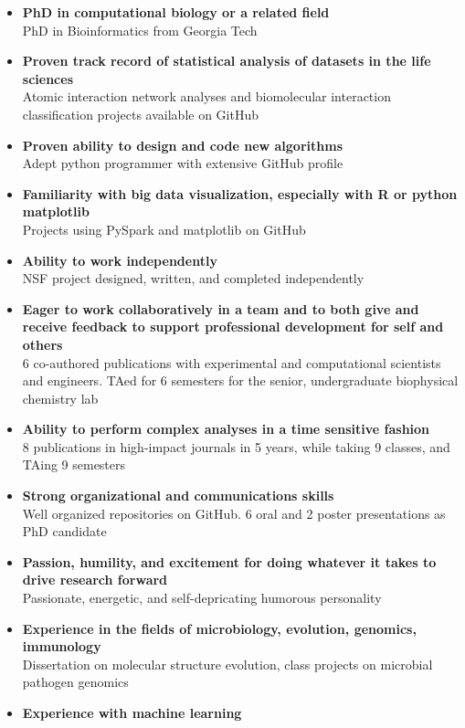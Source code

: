 \documentclass[11pt, letterpaper]{CV_latex_class}
\begin{document}
\begin{cvletter}
\begin{itemize}
	\setlength{\itemsep}{-0.75em}
	\item {\bf PhD in computational biology or a related field}
	\\ PhD in Bioinformatics from Georgia Tech
	\item {\bf Proven track record of statistical analysis of datasets in the life sciences}
	\\ Atomic interaction network analyses and biomolecular interaction classification projects available on GitHub
	\item {\bf Proven ability to design and code new algorithms}
	\\ Adept python programmer with extensive GitHub profile
	\item {\bf Familiarity with big data visualization, especially with R or python matplotlib}
	\\ Projects using PySpark and matplotlib on GitHub
	\item {\bf Ability to work independently}
	\\ NSF project designed, written, and completed independently
	\item {\bf Eager to work collaboratively in a team and to both give and receive feedback to support professional development for self and others}
	\\ 6 co-authored publications with experimental and computational scientists and engineers. TAed for 6 semesters for the senior, undergraduate biophysical chemistry lab
	\item {\bf Ability to perform complex analyses in a time sensitive fashion}
	\\ 8 publications in high-impact journals in 5 years, while taking 9 classes, and TAing 9 semesters
	\item {\bf Strong organizational and communications skills}
	\\ Well organized repositories on GitHub. 6 oral and 2 poster presentations as PhD candidate
	\item {\bf Passion, humility, and excitement for doing whatever it takes to drive research forward}
	\\ Passionate, energetic, and self-depricating humorous personality
	\item {\bf Experience in the fields of microbiology, evolution, genomics, immunology}
	\\ Dissertation on molecular structure evolution, class projects on microbial pathogen genomics
	\item {\bf Experience with machine learning}

\end{itemize}
\end{cvletter}
\end{document}
